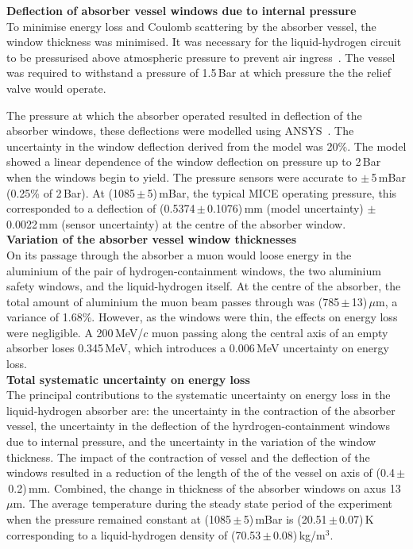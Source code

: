 \noindent\textbf{Deflection of absorber vessel windows due to internal
  pressure} \\
\noindent
To minimise energy loss and Coulomb scattering by the absorber vessel,
the window thickness was minimised.
It was necessary for the liquid-hydrogen circuit to be pressurised
above atmospheric pressure to prevent air
ingress~\cite{1748-0221-13-09-T09008}\cite{Ishimoto}. 
The vessel was required to withstand a pressure of 1.5\,Bar at which
pressure the the relief valve would operate.

The pressure at which the absorber operated resulted in deflection of
the absorber windows, these deflections were modelled using
ANSYS~\cite{NOTE155}.
The uncertainty in the window deflection derived from the model was
20\%.
The model showed a linear dependence of the window deflection on
pressure up to 2\,Bar when the windows begin to yield.
The pressure sensors were accurate to $\mathrm{\pm}$\,5\,mBar
(0.25\% of 2\,Bar).
At (1085\,$\mathrm{\pm}$\,5)\,mBar, the typical MICE operating
pressure, this corresponded to a deflection of
(0.5374\,$\mathrm{\pm}$\,0.1076)\,mm (model uncertainty)
$\mathrm{\pm}$\,0.0022\,mm (sensor uncertainty) at the centre of the
absorber window. \\

\noindent\textbf{Variation of the absorber vessel window thicknesses} \\
\noindent
On its passage through the absorber a muon would loose energy in the
aluminium of the pair of hydrogen-containment windows, the two
aluminium safety windows, and the liquid-hydrogen itself.
At the centre of the absorber, the total amount of aluminium the muon
beam passes through was (785\,$\mathrm{\pm}$\,13)\,$\mu$m, a variance
of 1.68\%.
However, as the windows were thin, the effects on energy loss were
negligible.
A 200\,MeV/$c$ muon passing along the central axis of an empty
absorber loses 0.345\,MeV, which introduces a 0.006\,MeV uncertainty
on energy loss.  \\

\noindent\textbf{Total systematic uncertainty on energy loss} \\
\noindent
The principal contributions to the systematic uncertainty on energy
loss in the liquid-hydrogen absorber are: the uncertainty in the
contraction of the absorber vessel, the uncertainty in the deflection
of the hyrdrogen-containment windows due to internal pressure, and the
uncertainty in the variation of the window thickness.
The impact of the contraction of vessel and the deflection of the
windows resulted in a reduction of the length of the of the vessel on
axis of (0.4\,$\mathrm{\pm}$\,0.2)\,mm.
Combined, the change in thickness of the absorber windows on axus
13\,$\mu$m.
The average temperature during the steady state period of the
experiment when the pressure remained constant at
(1085\,$\mathrm{\pm}$\,5)\,mBar is (20.51\,$\mathrm{\pm}$\,0.07)\,K
corresponding to a liquid-hydrogen density of
(70.53\,$\mathrm{\pm}$\,0.08)\,kg/m$^{3}$.

